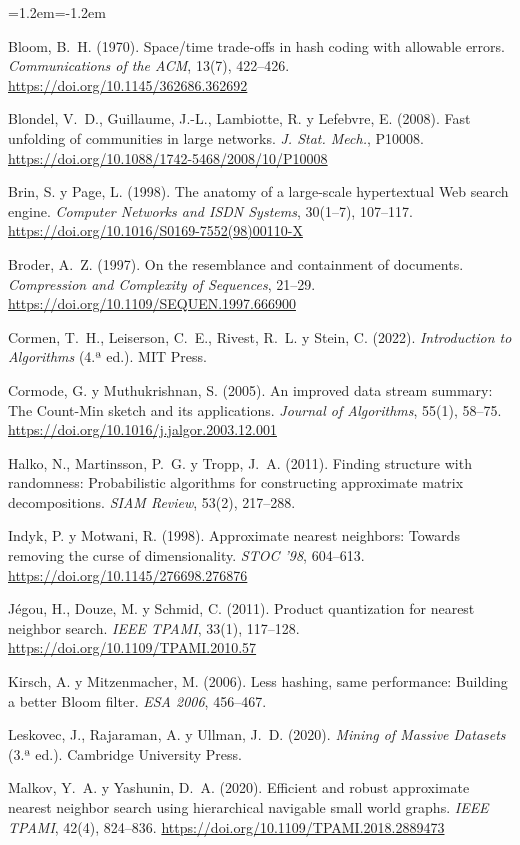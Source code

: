 \documentclass[11pt,letterpaper]{article}
\begin{document}
{\small
\begin{list}{}{\leftmargin=1.2em\itemindent=-1.2em\itemsep=3pt\parsep=0pt}
\item Bloom, B.~H. (1970). Space/time trade-offs in hash coding with allowable errors. \emph{Communications of the ACM}, 13(7), 422--426. \url{https://doi.org/10.1145/362686.362692}
\item Blondel, V.~D., Guillaume, J.-L., Lambiotte, R. y Lefebvre, E. (2008). Fast unfolding of communities in large networks. \emph{J. Stat. Mech.}, P10008. \url{https://doi.org/10.1088/1742-5468/2008/10/P10008}
\item Brin, S. y Page, L. (1998). The anatomy of a large-scale hypertextual Web search engine. \emph{Computer Networks and ISDN Systems}, 30(1--7), 107--117. \url{https://doi.org/10.1016/S0169-7552(98)00110-X}
\item Broder, A.~Z. (1997). On the resemblance and containment of documents. \emph{Compression and Complexity of Sequences}, 21--29. \url{https://doi.org/10.1109/SEQUEN.1997.666900}
\item Cormen, T.~H., Leiserson, C.~E., Rivest, R.~L. y Stein, C. (2022). \emph{Introduction to Algorithms} (4.ª ed.). MIT Press.
\item Cormode, G. y Muthukrishnan, S. (2005). An improved data stream summary: The Count-Min sketch and its applications. \emph{Journal of Algorithms}, 55(1), 58--75. \url{https://doi.org/10.1016/j.jalgor.2003.12.001}
\item Halko, N., Martinsson, P.~G. y Tropp, J.~A. (2011). Finding structure with randomness: Probabilistic algorithms for constructing approximate matrix decompositions. \emph{SIAM Review}, 53(2), 217--288.
\item Indyk, P. y Motwani, R. (1998). Approximate nearest neighbors: Towards removing the curse of dimensionality. \emph{STOC '98}, 604--613. \url{https://doi.org/10.1145/276698.276876}
\item Jégou, H., Douze, M. y Schmid, C. (2011). Product quantization for nearest neighbor search. \emph{IEEE TPAMI}, 33(1), 117--128. \url{https://doi.org/10.1109/TPAMI.2010.57}
\item Kirsch, A. y Mitzenmacher, M. (2006). Less hashing, same performance: Building a better Bloom filter. \emph{ESA 2006}, 456--467.
\item Leskovec, J., Rajaraman, A. y Ullman, J.~D. (2020). \emph{Mining of Massive Datasets} (3.ª ed.). Cambridge University Press.
\item Malkov, Y.~A. y Yashunin, D.~A. (2020). Efficient and robust approximate nearest neighbor search using hierarchical navigable small world graphs. \emph{IEEE TPAMI}, 42(4), 824--836. \url{https://doi.org/10.1109/TPAMI.2018.2889473}

\end{list}}
\end{document}
